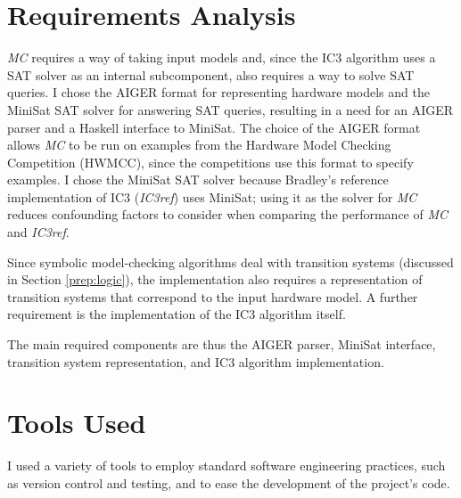 \documentclass[12pt,a4paper,twoside,openright]{report}
\begin{document}
\section{Requirements Analysis}
\label{prep:requirements}


\emph{MC} requires a way of taking input models and, since
the IC3 algorithm uses a SAT solver as an internal subcomponent, also
requires a way to solve SAT queries.
I chose the AIGER format for representing hardware models and the
MiniSat SAT solver for answering SAT queries, resulting in a need for an
AIGER parser and a Haskell interface to MiniSat. The choice of
the AIGER format allows \emph{MC} to be run on examples from
the Hardware Model Checking Competition (HWMCC), since the competitions
use this format to specify examples. I chose the MiniSat SAT
solver because Bradley's reference implementation of IC3 (\emph{IC3ref})
\cite{refic3} uses MiniSat; using it as the solver for \emph{MC}
reduces confounding factors to consider when comparing the performance
of \emph{MC} and \emph{IC3ref}.

Since symbolic model-checking algorithms deal with transition systems
(discussed in Section \ref{prep:logic}), the implementation also requires a representation of
transition systems that correspond to the input hardware model.
A further requirement is the implementation of the
IC3 algorithm itself.

The main required components are thus the AIGER parser, MiniSat interface,
transition system representation, and IC3 algorithm implementation.

\section{Tools Used}
\label{prep:tools}

I used a variety of tools to employ standard software engineering practices, such
as version control and testing, and to ease the development of
the project's code.
\end{document}
